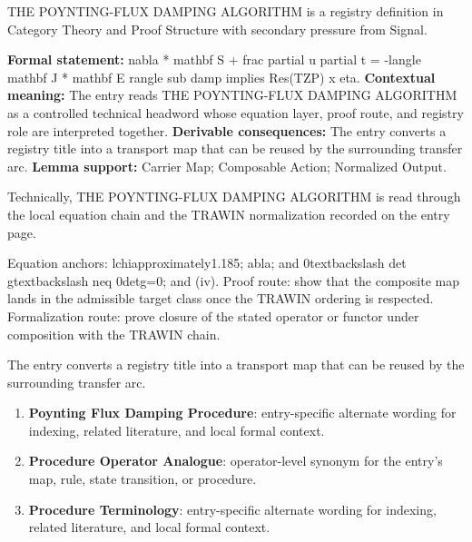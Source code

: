 
\begingroup\small
{}
THE POYNTING-FLUX DAMPING ALGORITHM is a registry definition in Category Theory and Proof Structure with secondary pressure from Signal.

\begingroup\footnotesize\setlength{\emergencystretch}{3em}\sloppy
\textbf{Formal statement:} nabla * mathbf S + frac partial u partial t = -langle mathbf J * mathbf E rangle sub damp implies Res(TZP) x eta. \textbf{Contextual meaning:} The entry reads THE POYNTING-FLUX DAMPING ALGORITHM as a controlled technical headword whose equation layer, proof route, and registry role are interpreted together. \textbf{Derivable consequences:} The entry converts a registry title into a transport map that can be reused by the surrounding transfer arc. \textbf{Lemma support:} Carrier Map; Composable Action; Normalized Output.\par
\endgroup

Technically, THE POYNTING-FLUX DAMPING ALGORITHM is read through the local equation chain and the TRAWIN normalization recorded on the entry page.

Equation anchors: lchiapproximately1.185; abla; and 0textbackslash det gtextbackslash neq 0detg=0; and (iv). Proof route: show that the composite map lands in the admissible target class once the TRAWIN ordering is respected. Formalization route: prove closure of the stated operator or functor under composition with the TRAWIN chain.

The entry converts a registry title into a transport map that can be reused by the surrounding transfer arc.
\endgroup

\begin{enumerate}[leftmargin=1.6em,itemsep=6pt,topsep=4pt]
\item \textbf{Poynting Flux Damping Procedure}: entry-specific alternate wording for indexing, related literature, and local formal context.
\item \textbf{Procedure Operator Analogue}: operator-level synonym for the entry's map, rule, state transition, or procedure.
\item \textbf{Procedure Terminology}: entry-specific alternate wording for indexing, related literature, and local formal context.
\end{enumerate}

